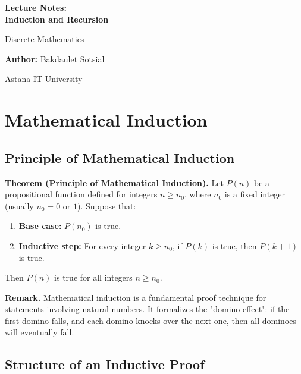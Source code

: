 \documentclass[11pt,a4paper]{article}
\begin{document}
\begin{titlepage}
    \centering
    \vspace*{4cm}
    
    {\Huge\bfseries Lecture Notes:\\ Induction and Recursion\par}
    \vspace{1cm}
    {\Large Discrete Mathematics\par}
    \vspace{2cm}
    {\large \textbf{Author:} Bakdaulet Sotsial\par}
    \vspace{1cm}
    
    \vfill
    {\small Astana IT University \par}
    \vspace*{2cm}
\end{titlepage}

\tableofcontents
\newpage

\section{Mathematical Induction}

\subsection{Principle of Mathematical Induction}

\textbf{Theorem (Principle of Mathematical Induction).} Let $P(n)$ be a propositional function defined for integers $n \geq n_0$, where $n_0$ is a fixed integer (usually $n_0 = 0$ or $1$). Suppose that:
\begin{enumerate}[label=(\roman*)]
    \item \textbf{Base case:} $P(n_0)$ is true.
    \item \textbf{Inductive step:} For every integer $k \geq n_0$, if $P(k)$ is true, then $P(k+1)$ is true.
\end{enumerate}
Then $P(n)$ is true for all integers $n \geq n_0$.

\textbf{Remark.} Mathematical induction is a fundamental proof technique for statements involving natural numbers. It formalizes the "domino effect": if the first domino falls, and each domino knocks over the next one, then all dominoes will eventually fall.

\subsection{Structure of an Inductive Proof}
\end{document}
